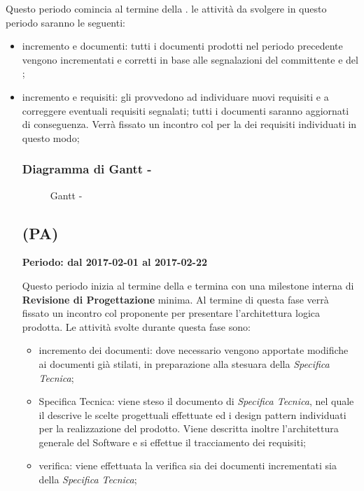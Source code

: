 \documentclass[./PianoDiProgetto.tex]{subfiles}
\begin{document}
  Questo periodo comincia al termine della \PerAR.  le attività da svolgere in questo periodo saranno le seguenti:
  \begin{itemize}
    \item incremento e  documenti: tutti i documenti prodotti nel periodo precedente vengono incrementati e corretti in base alle segnalazioni del committente e del ;
    \item incremento e  requisiti:  gli \ANP provvedono ad individuare nuovi requisiti e a correggere eventuali requisiti segnalati; tutti i documenti saranno aggiornati di conseguenza. Verrà fissato un incontro col  per la  dei requisiti individuati in questo modo;
  \subsubsection{Diagramma di Gantt - \PerAD}
    \begin{figure}[!h]
    \centering
    \caption{Gantt - \PerAD}
    \end{figure}

  \subsection{\PerPA{} (PA)}
  \textbf{Periodo: dal 2017-02-01 al 2017-02-22}

  Questo periodo inizia al termine della \PerAD{} e termina con una milestone interna di \textbf{Revisione di Progettazione} minima. Al termine di questa fase verrà fissato un incontro col proponente per presentare l'architettura logica prodotta. Le attività svolte durante questa fase sono:
  \begin{itemize}
    \item incremento dei documenti: dove necessario vengono apportate modifiche ai documenti già stilati, in preparazione alla stesuara della \textit{Specifica Tecnica};
    \item Specifica Tecnica: viene steso il documento di \textit{Specifica Tecnica}, nel quale il \PJ{} descrive le scelte progettuali effettuate ed i design pattern individuati per la realizzazione del prodotto. Viene descritta inoltre l'architettura generale del Software e si effettue il tracciamento dei requisiti;
    \item verifica: viene effettuata la verifica sia dei documenti incrementati sia della \textit{Specifica Tecnica};
  \end{itemize}

  \end{itemize}
\end{document}
